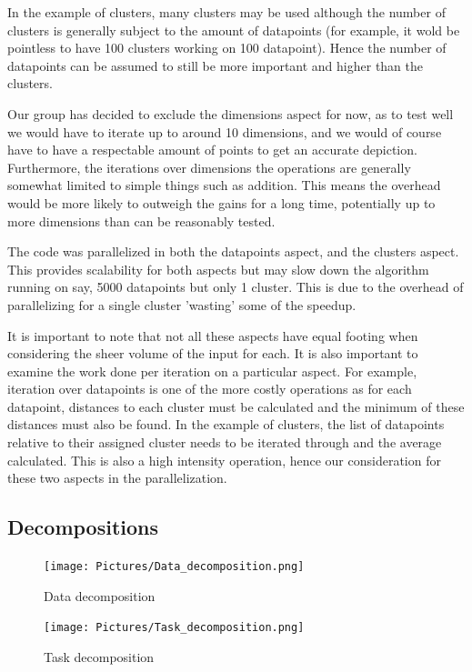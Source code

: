 \documentclass{article}
\begin{document}
In the example of clusters, many clusters may be used although the number of clusters is generally subject to the amount of datapoints (for example, it wold be pointless to have 100 clusters working on 100 datapoint). Hence the number of datapoints can be assumed to still be more important and higher than the clusters.

Our group has decided to exclude the dimensions aspect for now, as to test well we would have to iterate up to around 10 dimensions, and we would of course have to have a respectable amount of points to get an accurate depiction. Furthermore, the iterations over dimensions the operations are generally somewhat limited to simple things such as addition. This means the overhead would be more likely to outweigh the gains for a long time, potentially up to more dimensions than can be reasonably tested.

The code was parallelized in both the datapoints aspect, and the clusters aspect. This provides scalability for both aspects but may slow down the algorithm running on say, 5000 datapoints but only 1 cluster. This is due to the overhead of parallelizing for a single cluster 'wasting' some of the speedup.

It is important to note that not all these aspects have equal footing when considering the sheer volume of the input for each. It is also important to examine the work done per iteration on a particular aspect. For example, iteration over datapoints is one of the more costly operations as for each datapoint, distances to each cluster must be calculated and the minimum of these distances must also be found. In the example of clusters, the list of datapoints relative to their assigned cluster needs to be iterated through and the average calculated. This is also a high intensity operation, hence our consideration for these two aspects in the parallelization.

\subsection{Decompositions}
\begin{figure}[h!]
	\texttt{[image: Pictures/Data\_decomposition.png]}
	\caption{Data decomposition}
\end{figure}

\begin{figure}[h!]
	\texttt{[image: Pictures/Task\_decomposition.png]}
	\caption{Task decomposition}
\end{figure}
\end{document}
